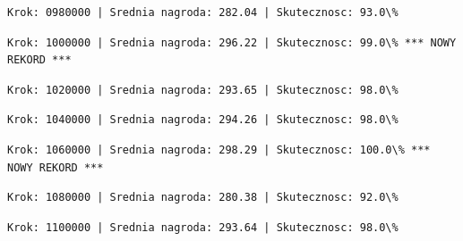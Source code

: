 \documentclass[11pt]{article}
\begin{document}
    
    
    \begin{Verbatim}[commandchars=\\\{\}]
Krok: 0980000 | Srednia nagroda: 282.04 | Skutecznosc: 93.0\%

    \end{Verbatim}

    
    
    \begin{Verbatim}[commandchars=\\\{\}]
Krok: 1000000 | Srednia nagroda: 296.22 | Skutecznosc: 99.0\% *** NOWY REKORD ***

    \end{Verbatim}

    
    
    \begin{Verbatim}[commandchars=\\\{\}]
Krok: 1020000 | Srednia nagroda: 293.65 | Skutecznosc: 98.0\%

    \end{Verbatim}

    
    
    \begin{Verbatim}[commandchars=\\\{\}]
Krok: 1040000 | Srednia nagroda: 294.26 | Skutecznosc: 98.0\%

    \end{Verbatim}

    
    
    \begin{Verbatim}[commandchars=\\\{\}]
Krok: 1060000 | Srednia nagroda: 298.29 | Skutecznosc: 100.0\% *** NOWY REKORD ***

    \end{Verbatim}

    
    
    \begin{Verbatim}[commandchars=\\\{\}]
Krok: 1080000 | Srednia nagroda: 280.38 | Skutecznosc: 92.0\%

    \end{Verbatim}

    
    
    \begin{Verbatim}[commandchars=\\\{\}]
Krok: 1100000 | Srednia nagroda: 293.64 | Skutecznosc: 98.0\%

    \end{Verbatim}
\end{document}

